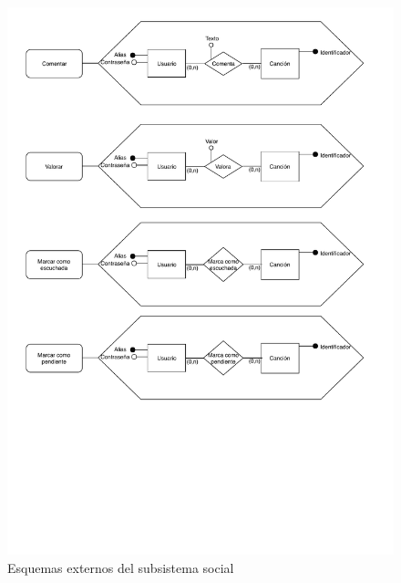 \begin{figure}[H]
  \caption{Esquemas externos del subsistema social}
  \centering
  \includegraphics[scale=0.9]{diagramas/Esq-ext-social.pdf}
\end{figure}
